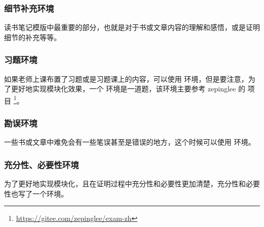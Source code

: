 \documentclass{xdyy-usermanual}
\begin{document}
\subsubsection{ 细节补充环境  }

读书笔记模版中最重要的部分，也就是对于书或文章内容的理解和感悟，或是证明细节的补充等等。



\subsubsection{ 习题环境  }

如果老师上课布置了习题或是习题课上的内容，可以使用  环境，但是要注意，为了更好地实现模块化效果，一个  环境是一道题，该环境主要参考 zepinglee 的  项目 \footnote{ \url{https://gitee.com/zepinglee/exam-zh}}。



\subsubsection{ 勘误环境  }

一些书或文章中难免会有一些笔误甚至是错误的地方，这个时候可以使用  环境。



\subsubsection{ 充分性、必要性环境  }

为了更好地实现模块化，且在证明过程中充分性和必要性更加清楚，充分性和必要性也写了一个环境。
\end{document}
